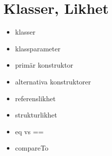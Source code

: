 \chapter{Klasser, Likhet}
\begin{itemize}[nosep]
\item klasser
\item klassparameter
\item primär konstruktor
\item alternativa konstruktorer
\item referenslikhet
\item strukturlikhet
\item eq vs ==
\item compareTo\end{itemize}
